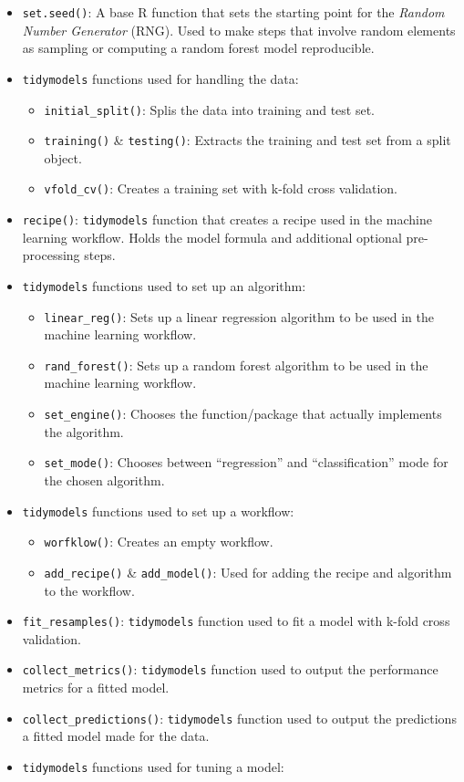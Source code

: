 \documentclass[
]{book}
\providecommand{\tightlist}{%
  \setlength{\itemsep}{0pt}\setlength{\parskip}{0pt}}
\begin{document}
\begin{itemize}
\tightlist
\item
  \texttt{set.seed()}: A base R function that sets the starting point for the \emph{Random Number Generator} (RNG). Used to make steps that involve random elements as sampling or computing a random forest model reproducible.
\item
  \texttt{tidymodels} functions used for handling the data:

  \begin{itemize}
  \tightlist
  \item
    \texttt{initial\_split()}: Splis the data into training and test set.
  \item
    \texttt{training()} \& \texttt{testing()}: Extracts the training and test set from a split object.
  \item
    \texttt{vfold\_cv()}: Creates a training set with k-fold cross validation.
  \end{itemize}
\item
  \texttt{recipe()}: \texttt{tidymodels} function that creates a recipe used in the machine learning workflow. Holds the model formula and additional optional pre-processing steps.
\item
  \texttt{tidymodels} functions used to set up an algorithm:

  \begin{itemize}
  \tightlist
  \item
    \texttt{linear\_reg()}: Sets up a linear regression algorithm to be used in the machine learning workflow.
  \item
    \texttt{rand\_forest()}: Sets up a random forest algorithm to be used in the machine learning workflow.
  \item
    \texttt{set\_engine()}: Chooses the function/package that actually implements the algorithm.
  \item
    \texttt{set\_mode()}: Chooses between ``regression'' and ``classification'' mode for the chosen algorithm.
  \end{itemize}
\item
  \texttt{tidymodels} functions used to set up a workflow:

  \begin{itemize}
  \tightlist
  \item
    \texttt{worfklow()}: Creates an empty workflow.
  \item
    \texttt{add\_recipe()} \& \texttt{add\_model()}: Used for adding the recipe and algorithm to the workflow.
  \end{itemize}
\item
  \texttt{fit\_resamples()}: \texttt{tidymodels} function used to fit a model with k-fold cross validation.
\item
  \texttt{collect\_metrics()}: \texttt{tidymodels} function used to output the performance metrics for a fitted model.
\item
  \texttt{collect\_predictions()}: \texttt{tidymodels} function used to output the predictions a fitted model made for the data.
\item
  \texttt{tidymodels} functions used for tuning a model:


\end{itemize}
\end{document}
